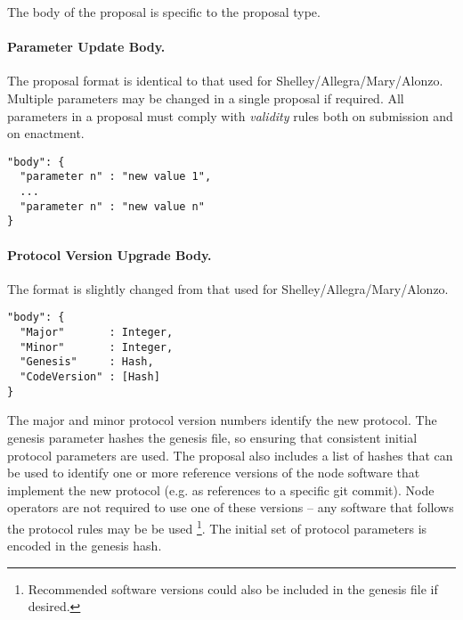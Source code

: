 The body of the proposal is specific to the proposal type.

\paragraph{Parameter Update Body.}  The proposal format is identical to that used for Shelley/Allegra/Mary/Alonzo.   Multiple parameters may be changed in a single proposal if required.
All parameters in a proposal must comply with \emph{validity} rules both on submission and on enactment.


\begin{verbatim}
"body": {
  "parameter n" : "new value 1",
  ...
  "parameter n" : "new value n"
}
\end{verbatim}

\paragraph{Protocol Version Upgrade Body.}  The format is slightly changed from that used for Shelley/Allegra/Mary/Alonzo.


\begin{verbatim}
"body": {
  "Major"       : Integer,
  "Minor"       : Integer,
  "Genesis"     : Hash,
  "CodeVersion" : [Hash]
}
\end{verbatim}

The major and minor protocol version numbers identify the new protocol.  The genesis parameter hashes the genesis file, so ensuring that consistent initial protocol parameters are used.
The proposal also includes a list of hashes that can be used to identify one or more reference versions of the node software that implement the new protocol (e.g. as references to a specific git commit).
Node operators are not required to use one of these versions -- any software that follows the protocol rules may be be used
\footnote{Recommended software versions could also be included in the genesis file if desired.}.
The initial set of protocol parameters is encoded in the genesis hash.

